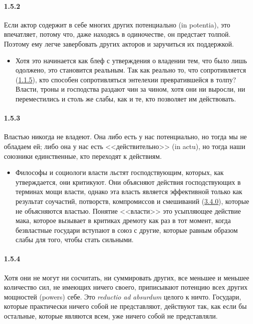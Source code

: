 \paragraph{1.5.2}\hypertarget{par:1.5.2}{} Если актор содержит в себе многих других потенциально (in potentia), это впечатляет, потому что, даже находясь в одиночестве, он предстает толпой. Поэтому ему легче завербовать других акторов и заручиться их поддержкой.
	\begin{itemize}
	\item Хотя это начинается как блеф с утверждения о владении тем, что было лишь одолжено, это становится реальным. Так как реально то, что сопротивляется (\hyperlink{par:1.1.5}{1.1.5}), кто способен сопротивляться энтелехии превратившейся в толпу? Власти, троны и господства раздают чин за чином, хотя они ни выросли, ни переместились и столь же слабы, как и те, кто позволяет им действовать.
	\end{itemize}

\paragraph{1.5.3}\hypertarget{par:1.5.3}{} Властью никогда не владеют. Она либо есть у нас потенциально, но тогда мы не обладаем ей; либо она у нас есть <<действительно>> (in actu), но тогда наши союзники единственные, кто переходят к действиям.
	\begin{itemize}
	\item Философы и социологи власти льстят господствующим, которых, как утверждается, они критикуют. Они объясняют действия господствующих в терминах мощи власти, однако эта власть является эффективной только как результат соучастий, потворств, компромиссов и смешиваний (\hyperlink{par:3.4.0}{3.4.0}), которые не объясняются властью. Понятие <<власти>> это усыпляющее действие мака, которое вызывает в критиках дремоту как раз в тот момент, когда безвластные государи вступают в союз с другие, которые равным образом слабы для того, чтобы стать сильными.
	\end{itemize}

\paragraph{1.5.4}\hypertarget{par:1.5.4}{} Хотя они не могут ни сосчитать, ни суммировать других, все меньшее и меньшее количество сил, не имеющих ничего своего, приписывают потенцию всех других мощностей (powers) себе. Это {\itshape reductio ad absurdum} целого к ничто. Государи, которые практически ничего собой не представляют, действуют так, как если бы остальные, которые являются всем, уже ничего собой не представляли.